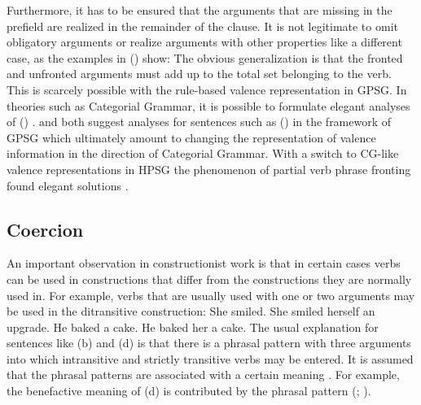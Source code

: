 \documentclass[output=paper]{langsci/langscibook}
\begin{document}
Furthermore, it has to be ensured that the arguments that are
missing in the prefield are realized in the remainder of the clause. It is not legitimate to omit
obligatory arguments or realize arguments with other properties like a different case, as the
examples in () show:
\eal
{}
\zl
The obvious generalization is that the fronted and unfronted arguments must add up to the total
set belonging to the verb. This is scarcely possible with the rule-based valence
representation in GPSG. In theories such as Categorial Grammar, it is possible to formulate elegant analyses of ()
\citep{Geach70a}. \citet{Nerbonne86a} and \citet{Johnson86a} both suggest analyses for sentences
such as () in the framework of GPSG which
ultimately amount to changing the representation of valence information in the direction of
Categorial Grammar.
With a switch to CG-like valence representations in HPSG the phenomenon of partial verb phrase
fronting found elegant solutions \parencites[Section~4]{HoehleSpuren}{Mueller96a}{Meurers99a}. 


\subsection{Coercion}
\label{sec-coercion}

An important observation in constructionist work is that in certain cases verbs can be used in
constructions that differ from the constructions they are normally used in. For example, verbs that are usually
used with one or two arguments may be used in the ditransitive construction:
\eal
\ex She smiled.
\ex She smiled herself an upgrade.
\ex He baked a cake.
\ex He baked her a cake.
\zl
The usual explanation for sentences like (b) and (d) is that there is a phrasal
pattern with three arguments into which intransitive and strictly transitive verbs may be
entered. It is assumed that the phrasal patterns are associated with a certain meaning \citep{Goldberg96a,GJ2004a}. For example,
the benefactive meaning of (d) is contributed by the phrasal pattern
(\citealt[]{Goldberg96a}; \citealt*[]{AGT2014a}).
\end{document}
